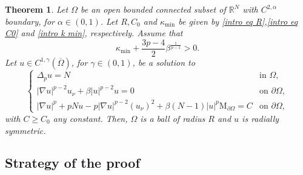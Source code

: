 \documentclass[10pt,a4paper, reqno]{amsart}
\numberwithin{equation}{section}
\newcommand{\R}{\mathbb{R}}
\newtheorem{teo}{Theorem}[section]
\begin{document}
\begin{teo}\label{intro main thm rigidity serrin}
    Let $\Omega$ be an open bounded connected subset of $\R^N$ with $C^{2,\alpha}$ boundary, for $\alpha \in (0,1)$. Let $R, C_0$ and $\kappa_{\min}$ be given by \eqref{intro eq R},\eqref{intro eq C0} and \eqref{intro k min}, respectively. Assume that
    \begin{equation}\label{intro eq condition kmin beta}
        \kappa_{\min} +  \frac{3p-4}{2} \beta^{\frac{1}{p-1}} > 0.
    \end{equation}
    Let $u \in C^{1,\gamma}(\overline{\Omega})$, for $\gamma \in (0,1)$, be a solution to
    \begin{equation}\label{intro eq: overdetermined problem}
    \begin{cases}
    \Delta_p u = N & \text{in } \Omega, \\
    |\nabla u|^{p-2} u_\nu  + \beta |u|^{p-2}u = 0 & \text{on } \partial\Omega, \\
    |\nabla u|^p + pNu - p |\nabla u|^{p-2} (u_\nu)^2 + \beta(N-1) |u|^p \mathrm{M}_{\partial\Omega} = C & \text{on } \partial\Omega,
    \end{cases}
    \end{equation}
    with $C \geq C_0$ any constant. Then, $\Omega$ is a ball of radius $R$ and $u$ is radially symmetric.
\end{teo}

\subsection{Strategy of the proof}\label{subsec strategy}
\end{document}
